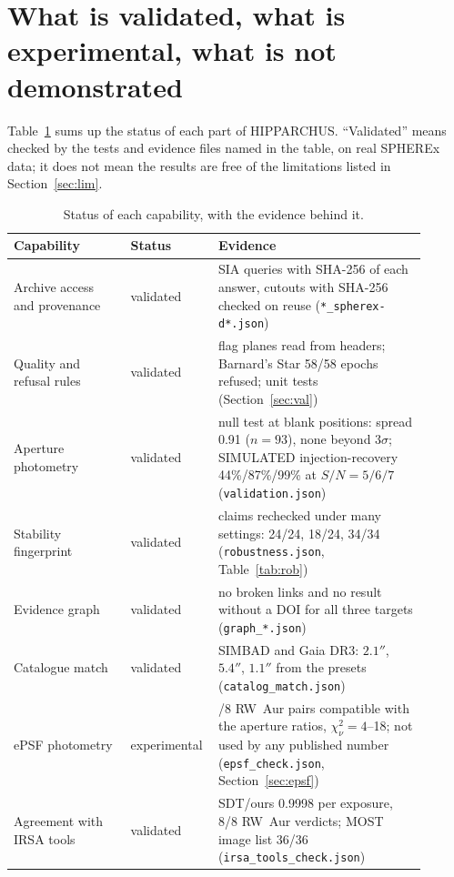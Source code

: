 \documentclass[11pt,a4paper]{article}
\begin{document}
\section{What is validated, what is experimental, what is not demonstrated}\label{sec:status}
Table~\ref{tab:status} sums up the status of each part of HIPPARCHUS. ``Validated'' means checked by the tests and
evidence files named in the table, on real SPHEREx data; it does not mean the results are free of the limitations listed
in Section~\ref{sec:lim}.

\begin{table}[h]\centering\small
\caption{Status of each capability, with the evidence behind it.}\label{tab:status}
\renewcommand{\arraystretch}{1.15}
\begin{tabular}{>{\raggedright\arraybackslash}p{0.27\linewidth}>{\raggedright\arraybackslash}p{0.15\linewidth}>{\raggedright\arraybackslash}p{0.48\linewidth}}\toprule
Capability & Status & Evidence\\\midrule
Archive access and provenance & validated & SIA queries with SHA-256 of each answer, cutouts with SHA-256 checked on reuse (\texttt{*\_spherex-d*.json})\\
Quality and refusal rules & validated & 18 flag planes read from headers; Barnard's Star 58/58 epochs refused; unit tests (Section~\ref{sec:val})\\
Aperture photometry & validated & null test at blank positions: spread 0.91 ($n=93$), none beyond $3\sigma$; SIMULATED injection-recovery 44\%/87\%/99\% at $S/N=5/6/7$ (\texttt{validation.json})\\
Stability fingerprint & validated & claims rechecked under many settings: 24/24, 18/24, 34/34 (\texttt{robustness.json}, Table~\ref{tab:rob})\\
Evidence graph & validated & no broken links and no result without a DOI for all three targets (\texttt{graph\_*.json})\\
Catalogue match & validated & SIMBAD and Gaia DR3: $2.1''$, $5.4''$, $1.1''$ from the presets (\texttt{catalog\_match.json})\\\midrule
ePSF photometry & experimental & 8/8 RW~Aur pairs compatible with the aperture ratios, $\chi^2_\nu=4$--18; not used by any published number (\texttt{epsf\_check.json}, Section~\ref{sec:epsf})\\\midrule
Agreement with IRSA tools & validated & SDT/ours 0.9998 per exposure, 8/8 RW~Aur verdicts; MOST image list 36/36 (\texttt{irsa\_tools\_check.json})\\

\end{tabular}
\end{table}
\end{document}
